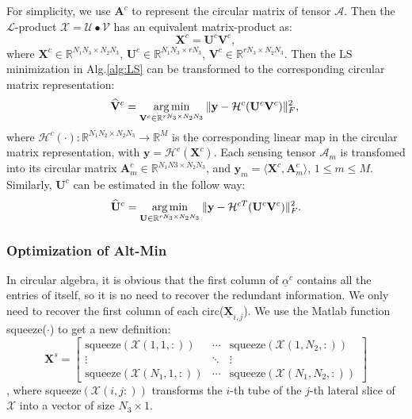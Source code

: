 \documentclass[futureinternet,article,submit,moreauthors,pdftex,10pt,a4paper]{Definitions/mdpi}
\theoremstyle{plain}
\theoremstyle{definition}
\theoremstyle{remark}
\begin{document}
For simplicity, we use $\mathbf{A}^c$ to represent the circular matrix of tensor $\mathcal{A}$. Then the $\mathcal{L}$-product $\mathcal{X} = \mathcal{U} \bullet \mathcal{V}$ has an equivalent matrix-product as:
\begin{equation}
    \mathbf{X}^c = \mathbf{U}^c\mathbf{V}^c,
\end{equation}
where $\mathbf{X}^c \in \mathbb{R}^{N_1N_3\times N_2N_3}$, $\mathbf{U}^c \in \mathbb{R}^{N_1N_3\times rN_3}$, $\mathbf{V}^c \in \mathbb{R}^{rN_3\times N_2N_3}$. Then the LS minimization in Alg.\ref{alg:LS} can be transformed to the corresponding circular matrix representation:
\begin{equation}
    \widehat{\mathbf{V}}^c = 
    \mathop{\arg\min}_{ \mathbf{V}^c \in \mathbb{R}^{rN_3 \times N_2N_3}} \| \mathbf{y} - \mathcal{H}^c(\mathbf{U}^c\mathbf{V}^c) \|_F^2 , \\
\end{equation}
where $\mathcal{H}^c(\cdot): \mathbb{R}^{N_1N_2 \times N_2N_3} \to \mathbb{R}^M$ is the corresponding linear map in the circular matrix representation, with $\mathbf{y} = \mathcal{H}^c(\mathbf{X}^c)$. Each sensing tensor $\mathcal{A}_m$ is transfomed into its circular matrix $\mathbf{A}^c_m \in \mathbb{R}^{N_1N3 \times N_2N_3}$, and $\mathbf{y}_m = \langle \mathbf{X}^c, \mathbf{A}^c_m \rangle$, $1 \leq m \leq M$. Similarly, $\mathbf{U}^c$ can be estimated in the follow way:
\begin{equation}
    \label{eqa:8}
    \widehat{\mathbf{U}}^c =
    \mathop{\arg\min}_{ \mathbf{U} \in \mathbb{R}^{rN_3 \times N_2N_3}} \| \mathbf{y} - \mathcal{H}^{cT}(\mathbf{U}^c\mathbf{V}^c) \|_F^2 . \\
\end{equation}


\subsubsection{Optimization of Alt-Min}
In circular algebra, it is obvious that the first column of $\underline{\alpha}^c$ contains all the entries of itself, so it is no need to recover the redundant information. We only need to recover the first column of each circ($\underline{\mathbf{X}}_{i,j}$). We use the Matlab function squeeze($\cdot$)  to get a new definition:
\[
    \mathbf{X}^s = \begin{bmatrix}
        \text{squeeze}(\mathcal{X}(1,1,:)) & \cdots & \text{squeeze}(\mathcal{X}(1,N_2,:)) \\
        \vdots & \ddots & \vdots \\
        \text{squeeze}(\mathcal{X}(N_1,1,:)) & \cdots & \text{squeeze}(\mathcal{X}(N_1,N_2,:))
    \end{bmatrix}
\],
where squeeze$(\mathcal{X}(i,j:))$ transforms the $i$-th tube of the $j$-th lateral slice of $\mathcal{X}$ into a vector of size $N_3 \times 1$.
\end{document}
